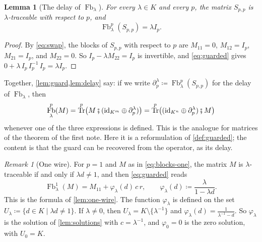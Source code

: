 \documentclass[11pt,a4paper]{article}
\theoremstyle{plain}
\newtheorem{lemma}[theorem]{Lemma}
\theoremstyle{definition}
\theoremstyle{remark}
\newtheorem{remark}[theorem]{Remark}
\DeclareMathOperator{\Fb}{Fb}
\DeclareMathOperator{\Tr}{Tr}
\newcommand{\id}{\mathrm{id}}
\newcommand{\then}{\mathbin{\fatsemi}}
\begin{document}
\begin{lemma}[The delay of $\Fb_\lambda$]
    \label{lem:delay}
    For every $\lambda \in K$ and every $p$, the matrix $S_{p,p}$ is $\lambda$-traceable with respect to $p$, and
    \begin{equation}
        \Fb_\lambda^p(S_{p,p}) = \lambda I_p .
    \end{equation}
\end{lemma}

\begin{proof}
    By \cref{eq:swap}, the blocks of $S_{p,p}$ with respect to $p$ are $M_{11} = 0$, $M_{12} = I_p$, $M_{21} = I_p$, and $M_{22} = 0$.
    So $I_p - \lambda M_{22} = I_p$ is invertible, and \cref{eq:guarded} gives $0 + \lambda\, I_p\, I_p^{-1}\, I_p = \lambda I_p$.
\end{proof}

Together, \cref{lem:guard,lem:delay} say: if we write $\partial^\lambda_p \coloneqq \Fb^p_\lambda(S_{p,p})$ for the delay of $\Fb_\lambda$, then
\begin{equation}
    \label{eq:guarded-headline}
    \Fb^p_\lambda(M) = \Tr^p\bigl( M \then (\id_{K^m} \oplus \partial^\lambda_p) \bigr) = \Tr^p\bigl( (\id_{K^n} \oplus \partial^\lambda_p) \then M \bigr)
\end{equation}
whenever one of the three expressions is defined.
This is the analogue for matrices of the theorem of the first note.
Here it is a reformulation of \cref{def:guarded}; the content is that the guard can be recovered from the operator, as its delay.

\begin{remark}[One wire]
    \label{rem:guarded-one-wire}
    For $p = 1$ and $M$ as in \cref{eq:blocks-one}, the matrix $M$ is $\lambda$-traceable if and only if $\lambda d \neq 1$, and then \cref{eq:guarded} reads
    \begin{equation}
        \label{eq:guarded-one-wire}
        \Fb^1_\lambda(M) = M_{11} + \varphi_\lambda(d)\, c\, r,
        \qquad
        \varphi_\lambda(d) \coloneqq \frac{\lambda}{1 - \lambda d} .
    \end{equation}
    This is the formula of \cref{lem:one-wire}.
    The function $\varphi_\lambda$ is defined on the set $U_\lambda \coloneqq \{ d \in K \mid \lambda d \neq 1 \}$.
    If $\lambda \neq 0$, then $U_\lambda = K \setminus \{ \lambda^{-1} \}$ and $\varphi_\lambda(d) = \frac{1}{\lambda^{-1} - d}$.
    So $\varphi_\lambda$ is the solution of \cref{lem:solutions} with $c = \lambda^{-1}$, and $\varphi_0 = 0$ is the zero solution, with $U_0 = K$.
\end{remark}
\end{document}
